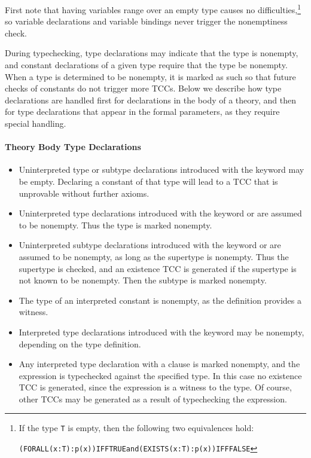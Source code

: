First note that having variables range over an empty type causes no
difficulties,\footnote{If the type \texttt{T} is empty, then the following
two equivalences hold:
\begin{alltt}
  (FORALL (x: T): p(x)) IFF TRUE \quad \mbox{\textrm{and}} \quad (EXISTS (x: T): p(x)) IFF FALSE
\end{alltt}
}
so variable declarations and variable bindings never trigger the
nonemptiness check.

During typechecking, type declarations may indicate that the type is
nonempty, and constant declarations of a given type require that the type
be nonempty.  When a type is determined to be nonempty, it is marked as
such so that future checks of constants do not trigger more TCCs.  Below
we describe how type declarations are handled first for declarations in the
body of a theory, and then for type declarations that appear in the formal
parameters, as they require special handling.

\paragraph{Theory Body Type Declarations}

\begin{itemize}

\item Uninterpreted type or subtype declarations introduced with the
keyword  may be empty.  Declaring a constant of that type
will lead to a TCC that is unprovable without further axioms.

\item Uninterpreted type declarations introduced with the keyword
or  are assumed to be nonempty.
Thus the type is marked nonempty.

\item Uninterpreted subtype declarations introduced with the keyword
 or  are assumed to be nonempty, as long as the
supertype is nonempty.  Thus the supertype is checked, and an existence
TCC is generated if the supertype is not known to be nonempty.  Then the
subtype is marked nonempty.

\item The type of an interpreted constant is nonempty, as the definition
provides a witness.

\item Interpreted type declarations introduced with the keyword
 may be non\-emp\-ty, depending on the type definition.

\item Any interpreted type declaration with a  clause
is marked nonempty, and the  expression is typechecked
against the specified type.  In this case no existence TCC is generated,
since the  expression is a witness to the type.  Of
course, other TCCs may be generated as a result of typechecking the
 expression.

\end{itemize}

